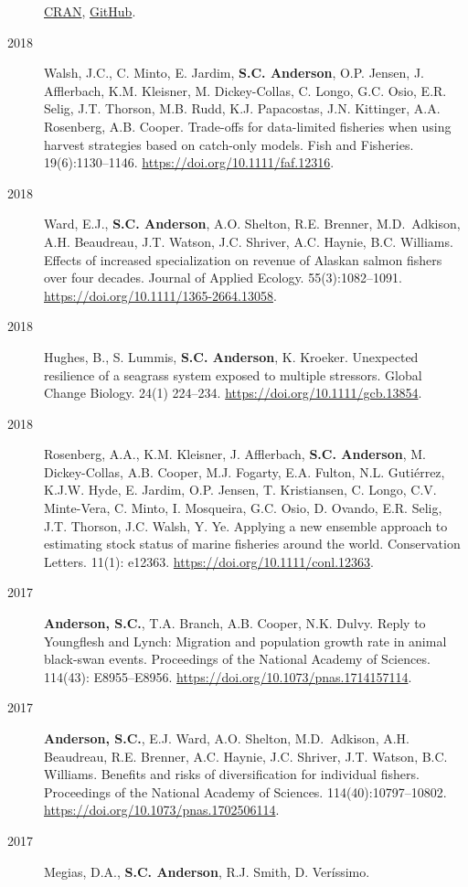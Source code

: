 \begin{description}
\href{https://cran.r-project.org/package=glmmfields}{CRAN},
\href{https://github.com/seananderson/glmmfields}{GitHub}.
\item[2018]
Walsh, J.C., C. Minto, E. Jardim, \textbf{S.C. Anderson}, O.P. Jensen,
J. Afflerbach, K.M. Kleisner, M. Dickey-Collas, C. Longo, G.C. Osio,
E.R. Selig, J.T. Thorson, M.B. Rudd, K.J. Papacostas, J.N. Kittinger,
A.A. Rosenberg, A.B. Cooper. Trade-offs for data-limited fisheries when
using harvest strategies based on catch-only models. Fish and Fisheries.
19(6):1130--1146. \url{https://doi.org/10.1111/faf.12316}.
\item[2018]
Ward, E.J., \textbf{S.C. Anderson}, A.O. Shelton, R.E. Brenner,
M.D.\ Adkison, A.H. Beaudreau, J.T. Watson, J.C. Shriver, A.C. Haynie,
B.C. Williams. Effects of increased specialization on revenue of Alaskan
salmon fishers over four decades. Journal of Applied Ecology.
55(3):1082--1091. \url{https://doi.org/10.1111/1365-2664.13058}.
\item[2018]
Hughes, B., S. Lummis, \textbf{S.C. Anderson}, K. Kroeker. Unexpected
resilience of a seagrass system exposed to multiple stressors. Global
Change Biology. 24(1) 224--234. \url{https://doi.org/10.1111/gcb.13854}.
\item[2018]
Rosenberg, A.A., K.M. Kleisner, J. Afflerbach, \textbf{S.C. Anderson},
M. Dickey-Collas, A.B. Cooper, M.J. Fogarty, E.A. Fulton, N.L.
Gutiérrez, K.J.W. Hyde, E. Jardim, O.P. Jensen, T. Kristiansen, C.
Longo, C.V. Minte-Vera, C. Minto, I. Mosqueira, G.C. Osio, D. Ovando,
E.R. Selig, J.T. Thorson, J.C. Walsh, Y. Ye. Applying a new ensemble
approach to estimating stock status of marine fisheries around the
world. Conservation Letters. 11(1): e12363.
\url{https://doi.org/10.1111/conl.12363}.
\item[2017]
\textbf{Anderson, S.C.}, T.A. Branch, A.B. Cooper, N.K. Dulvy. Reply to
Youngflesh and Lynch: Migration and population growth rate in animal
black-swan events. Proceedings of the National Academy of Sciences.
114(43): E8955--E8956. \url{https://doi.org/10.1073/pnas.1714157114}.
\item[2017]
\textbf{Anderson, S.C.}, E.J. Ward, A.O. Shelton, M.D.\ Adkison, A.H.
Beaudreau, R.E. Brenner, A.C. Haynie, J.C. Shriver, J.T. Watson, B.C.
Williams. Benefits and risks of diversification for individual fishers.
Proceedings of the National Academy of Sciences. 114(40):10797--10802.
\url{https://doi.org/10.1073/pnas.1702506114}.
\item[2017]
Megias, D.A., \textbf{S.C. Anderson}, R.J. Smith, D. Veríssimo.

\end{description}
